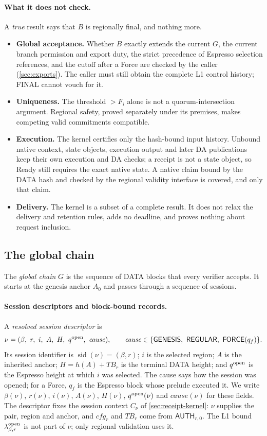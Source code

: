 \documentclass[11pt,a4paper]{article}
\newcommand{\TB}{\mathit{TB}}
\newcommand{\tagg}[1]{\ensuremath{\mathsf{#1}}}
\newcommand{\defterm}[1]{\textcolor{rrBlue}{\textit{#1}}}
\begin{document}
\paragraph{What it does not check.}
A \emph{true} result says that $B$ is regionally final, and nothing more.
\begin{itemize}[itemsep=2pt]
\item \textbf{Global acceptance.} Whether $B$ exactly extends the
current $G$, the current branch permission and export duty, the strict
precedence of Espresso selection references, and the cutoff after a
Force are checked by the caller (\cref{sec:exports}). The caller must
still obtain the complete L1 control history; FINAL cannot vouch
for it.
\item \textbf{Uniqueness.} The threshold $>F_i$ alone is not a
quorum-intersection argument. Regional safety, proved separately under
its premises, makes competing valid commitments compatible.
\item \textbf{Execution.} The kernel certifies only the hash-bound
input history. Unbound native context, state objects, execution output
and later DA publications keep their own execution and DA
checks; a receipt is not a state object, so Ready still requires the
exact native state. A native claim bound by the DATA hash and checked by
the regional validity interface is covered, and only that claim.
\item \textbf{Delivery.} The kernel is a subset of a complete result.
It does not relax the delivery and retention rules, adds no deadline,
and proves nothing about request inclusion.
\end{itemize}

\subsection{The global chain}
\label{sec:global-finality}
\label{sec:global-chain}
The \defterm{global chain} $G$ is the sequence of DATA blocks that every
verifier accepts. It starts at the genesis anchor $A_0$ and passes
through a sequence of sessions.

\paragraph{Session descriptors and block-bound records.}
A \defterm{resolved session descriptor} is
\[
 \nu=(\beta,\ r,\ i,\ A,\ H,\ q^{\rm open},\ \mathit{cause}),\qquad
 \mathit{cause}\in\{\tagg{GENESIS},\ \tagg{REGULAR},\ \tagg{FORCE}(q_f)\}.
\]
Its session identifier is $\operatorname{sid}(\nu)=(\beta,r)$; $i$ is
the selected region; $A$ is the inherited anchor;
$H=h(A)+\TB_r$ is the terminal DATA height; and $q^{\rm open}$ is the
Espresso height at which $i$ was selected.  The cause says how the
session was opened; for a Force, $q_f$ is the Espresso block whose
prelude executed it.  We write $\beta(\nu)$, $r(\nu)$, $i(\nu)$,
$A(\nu)$, $H(\nu)$, $q^{\rm open}(\nu)$ and
$\mathit{cause}(\nu)$ for these fields.  The descriptor fixes the session context $C_\nu$
of \cref{sec:receipt-kernel}: $\nu$ supplies the pair, region and anchor,
and $\mathit{cfg}_r$ and $\TB_r$ come from $\tagg{AUTH}_{r,0}$.  The L1
bound $\lambda^{\rm open}_{\beta,r}$ is not part of $\nu$; only regional
validation uses it.
\end{document}
